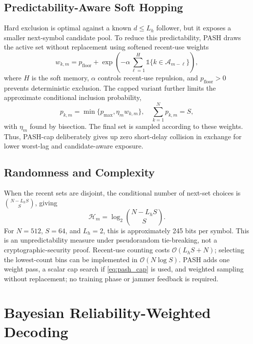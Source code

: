 \documentclass[journal,10pt]{IEEEtran}
\begin{document}
\subsection{Predictability-Aware Soft Hopping}
Hard exclusion is optimal against a known $d\leq L_h$ follower, but it exposes
a smaller next-symbol candidate pool. To reduce this predictability, PASH draws
the active set without replacement using softened recent-use weights
\begin{equation}
w_{k,m}=p_{\mathrm{floor}}+
\exp\left(-\alpha\sum_{\ell=1}^{H}
\mathds{1}\{k\in\mathcal{A}_{m-\ell}\}\right),
\label{eq:pash_weight}
\end{equation}
where $H$ is the soft memory, $\alpha$ controls recent-use repulsion, and
$p_{\mathrm{floor}}>0$ prevents deterministic exclusion. The capped variant
further limits the approximate conditional inclusion probability,
\begin{equation}
p_{k,m}=\min\{p_{\max},\eta_m w_{k,m}\},\quad
\sum_{k=1}^{N}p_{k,m}=S,
\label{eq:pash_cap}
\end{equation}
with $\eta_m$ found by bisection. The final set is sampled according to these
weights. Thus, PASH-cap deliberately gives up zero short-delay collision in
exchange for lower worst-lag and candidate-aware exposure.

\subsection{Randomness and Complexity}
When the recent sets are disjoint, the conditional number of next-set choices
is $\binom{N-L_hS}{S}$, giving
\begin{equation}
\mathcal{H}_m=\log_2\binom{N-L_hS}{S}.
\label{eq:entropy}
\end{equation}
For $N=512$, $S=64$, and $L_h=2$, this is approximately 245 bits per symbol.
This is an unpredictability measure under pseudorandom tie-breaking, not a
cryptographic-security proof. Recent-use counting costs
$\mathcal{O}(L_hS+N)$; selecting the lowest-count bins can be implemented in
$\mathcal{O}(N\log S)$. PASH adds one weight pass, a scalar cap search if
\eqref{eq:pash_cap} is used, and weighted sampling without replacement; no
training phase or jammer feedback is required.

\section{Bayesian Reliability-Weighted Decoding}
\end{document}
